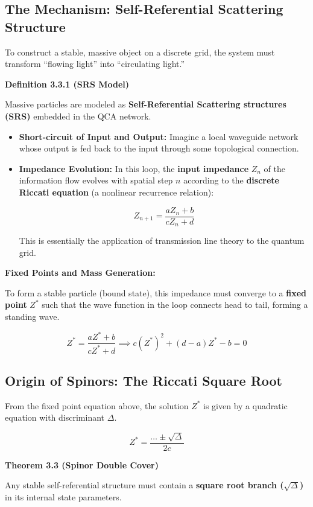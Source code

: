 \documentclass[11pt,a4paper,twoside]{book}
\begin{document}
\subsection{The Mechanism: Self-Referential Scattering Structure}

To construct a stable, massive object on a discrete grid, the system must transform ``flowing light'' into ``circulating light.''

\textbf{Definition 3.3.1 (SRS Model)}

Massive particles are modeled as \textbf{Self-Referential Scattering structures (SRS)} embedded in the QCA network.

\begin{itemize}
\item \textbf{Short-circuit of Input and Output:} Imagine a local waveguide network whose output is fed back to the input through some topological connection.

\item \textbf{Impedance Evolution:} In this loop, the \textbf{input impedance} $Z_n$ of the information flow evolves with spatial step $n$ according to the \textbf{discrete Riccati equation} (a nonlinear recurrence relation):

    $$Z_{n+1} = \frac{a Z_n + b}{c Z_n + d}$$

    This is essentially the application of transmission line theory to the quantum grid.
\end{itemize}

\textbf{Fixed Points and Mass Generation:}

To form a stable particle (bound state), this impedance must converge to a \textbf{fixed point} $Z^*$ such that the wave function in the loop connects head to tail, forming a standing wave.

$$Z^* = \frac{a Z^* + b}{c Z^* + d} \implies c(Z^*)^2 + (d-a)Z^* - b = 0$$

\subsection{Origin of Spinors: The Riccati Square Root}

From the fixed point equation above, the solution $Z^*$ is given by a quadratic equation with discriminant $\Delta$.

$$Z^* = \frac{\dots \pm \sqrt{\Delta}}{2c}$$

\textbf{Theorem 3.3 (Spinor Double Cover)}

Any stable self-referential structure must contain a \textbf{square root branch ($\sqrt{\Delta}$)} in its internal state parameters.
\end{document}
